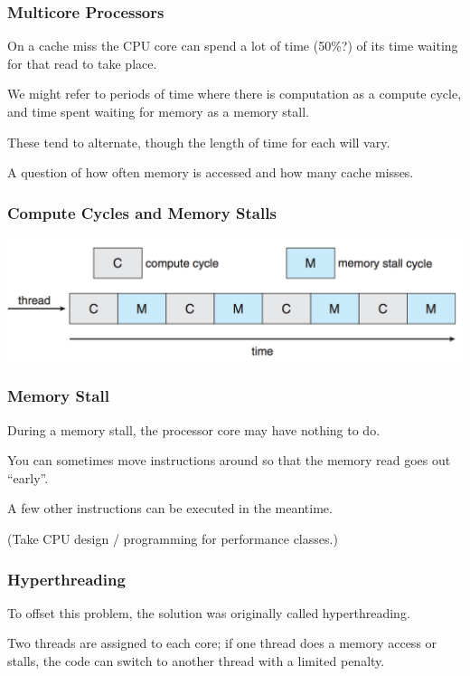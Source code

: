 \begin{frame}
\frametitle{Multicore Processors}

On a cache miss the CPU core can spend a lot of time (50\%?) of its time waiting for that read to take place.

  We might refer to periods of time where there is computation as a compute cycle, and time spent waiting for memory as a \alert{memory stall}. 
  
  These tend to alternate, though the length of time for each will vary. 
  
  A question of how often memory is accessed and how many cache misses.

\end{frame}

\begin{frame}
\frametitle{Compute Cycles and Memory Stalls}

\begin{center}
	\includegraphics[width=\textwidth]{images/memory-stall.png}
\end{center}

\end{frame}

\begin{frame}
\frametitle{Memory Stall}

During a memory stall, the processor core may have nothing to do. 

You can sometimes move instructions around so that the memory read goes out ``early''.

A few other instructions can be executed in the meantime. 

(Take CPU design / programming for performance classes.)

\end{frame}

\begin{frame}
\frametitle{Hyperthreading}

To offset this problem, the solution was originally called \alert{hyperthreading}.

Two threads are assigned to each core; if one thread does a memory access or stalls, the code can switch to another thread with a limited penalty. 

\end{frame}

